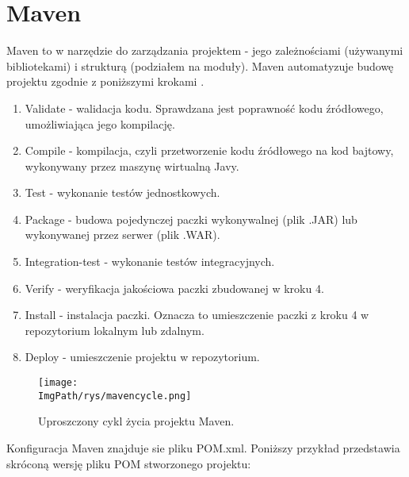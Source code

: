 \documentclass[a4paper,12pt,twoside,openany]{report}
\newcommand{\ImgPath}{.}
\begin{document}
\section{Maven}
Maven to w narzędzie do zarządzania projektem - jego zależnościami (używanymi bibliotekami) i strukturą (podziałem na moduły). Maven automatyzuje budowę projektu zgodnie z poniższymi krokami \cite{Maven}.
\begin{enumerate}
	\item Validate - walidacja kodu. Sprawdzana jest poprawność kodu źródłowego, umożliwiająca jego kompilację.
	\item Compile - kompilacja, czyli przetworzenie kodu źródłowego na kod bajtowy, wykonywany przez maszynę wirtualną Javy.
	\item Test - wykonanie testów jednostkowych.
	\item Package - budowa pojedynczej paczki wykonywalnej (plik .JAR) lub wykonywanej przez serwer (plik .WAR).
	\item Integration-test - wykonanie testów integracyjnych.
	\item Verify - weryfikacja jakościowa paczki zbudowanej w kroku 4.
	\item Install - instalacja paczki. Oznacza to umieszczenie paczki z kroku 4 w repozytorium lokalnym lub zdalnym.
	\item Deploy - umieszczenie projektu w repozytorium.
\end{enumerate}
				\begin{figure}[!htbp]
					\begin{center}
						\centering
						\texttt{[image: \\ImgPath/rys/mavencycle.png]}
					\end{center}
					\caption{Uproszczony cykl życia projektu Maven.}
					\label{UMLTS}
				\end{figure}
Konfiguracja Maven znajduje sie pliku POM.xml. Poniższy przykład przedstawia skróconą wersję pliku POM stworzonego projektu:
\end{document}
